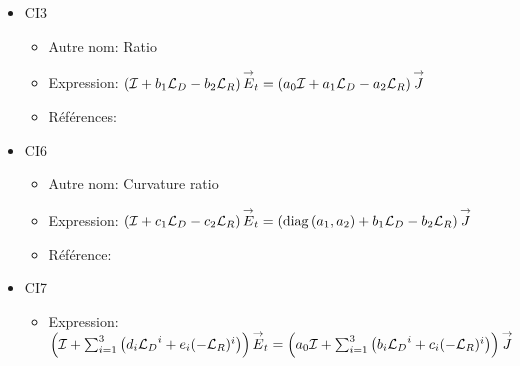 \begin{itemize}
  \item \hypertarget{ci3}{CI3}
  \begin{itemize}
    \item Autre nom: Ratio
    \item Expression: \(\left({\mathcal{I}} + b_1 {\mathcal{L}_D} - b_2 {\mathcal{L}_R} \right){\overset{\rightarrow}{E}}_t = \left(a_0{\mathcal{I}} + a_1 {\mathcal{L}_D} - a_2 {\mathcal{L}_R} \right){\overset{\rightarrow}{J}}\)
    \item Références: \cite{hoppe_impedance_1995,marceaux_high-order_2000,aubakirov_electromagnetic_2014}
  \end{itemize}

  \item \hypertarget{ci6}{CI6}
  \begin{itemize}
    \item Autre nom: Curvature ratio
    \item Expression: \(\left({\mathcal{I}} + c_1 {\mathcal{L}_D} - c_2 {\mathcal{L}_R} \right){\overset{\rightarrow}{E}}_t = \left(\operatorname{diag}\left(a_1,a_2\right) + b_1 {\mathcal{L}_D} - b_2 {\mathcal{L}_R} \right){\overset{\rightarrow}{J}}\)
    \item Référence: \cite{hoppe_impedance_1995}
  \end{itemize}

  \item \hypertarget{ci7}{CI7}
  \begin{itemize}
    \item Expression: \(\left({\mathcal{I}} + \sum_{i=1}^3\left( d_i {\mathcal{L}_D}^i + e_i (-{\mathcal{L}_R})^i\right) \right){\overset{\rightarrow}{E}}_t = \left(a_0{\mathcal{I}} + \sum_{i=1}^3\left( b_i {\mathcal{L}_D}^i + c_i (-{\mathcal{L}_R})^i\right) \right){\overset{\rightarrow}{J}}\)
  \end{itemize}
\end{itemize}
